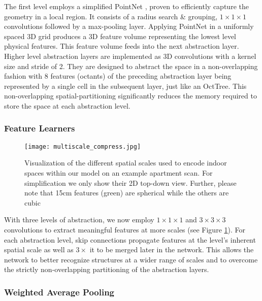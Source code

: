 \documentclass[runningheads]{llncs}
\begin{document}
The first level employs a simplified PointNet \cite{Qi2017_2}, proven to efficiently capture the geometry in a local region. It consists of a radius search \& grouping, $1\times1\times1$ convolutions followed by a max-pooling layer. Applying PointNet in a uniformly spaced 3D grid produces a 3D feature volume representing the lowest level physical features. This feature volume feeds into the next abstraction layer. Higher level abstraction layers are implemented as 3D convolutions with a kernel size and stride of 2. They are designed to abstract the space in a non-overlapping fashion with 8 features (octants) of the preceding abstraction layer being represented by a single cell in the subsequent layer, just like an OctTree. This non-overlapping spatial-partitioning significantly reduces the memory required to store the space at each abstraction level.

\subsubsection{Feature Learners}

\begin{figure}[t]
    \centering
 \texttt{[image: multiscale\_compress.jpg]}
    \caption{Visualization of the different spatial scales used to encode indoor spaces within our model on an example apartment scan. For simplification we only show their 2D top-down view. Further, please note that 15cm features (green) are spherical while the others are cubic}
    \label{fig:multiscale}  
\end{figure}

With three levels of abstraction, we now employ $1 \times 1 \times 1$ and $3 \times 3 \times 3$ convolutions to extract meaningful features at more scales (see Figure \ref{fig:multiscale}). For each abstraction level, skip connections propagate features at the level's inherent spatial scale as well as $3 \times$ it to be merged later in the network. This allows the network to better recognize structures at a wider range of scales and to overcome the strictly non-overlapping partitioning of the abstraction layers. 

\subsubsection{Weighted Average Pooling}
\end{document}
